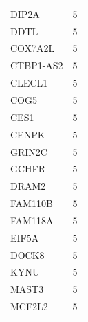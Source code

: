 \documentclass[a4paper,12pt]{article}
\begin{document}
\begin{longtable}{ll}
  DIP2A         & 5                                                                                     \\
  DDTL          & 5                                                                                     \\
  COX7A2L       & 5                                                                                     \\
  CTBP1-AS2     & 5                                                                                     \\
  CLECL1        & 5                                                                                     \\
  COG5          & 5                                                                                     \\
  CES1          & 5                                                                                     \\
  CENPK         & 5                                                                                     \\
  GRIN2C        & 5                                                                                     \\
  GCHFR         & 5                                                                                     \\
  DRAM2         & 5                                                                                     \\
  FAM110B       & 5                                                                                     \\
  FAM118A       & 5                                                                                     \\
  EIF5A         & 5                                                                                     \\
  DOCK8         & 5                                                                                     \\
  KYNU          & 5                                                                                     \\
  MAST3         & 5                                                                                     \\
  MCF2L2        & 5                                                                                     \\

\end{longtable}
\end{document}
